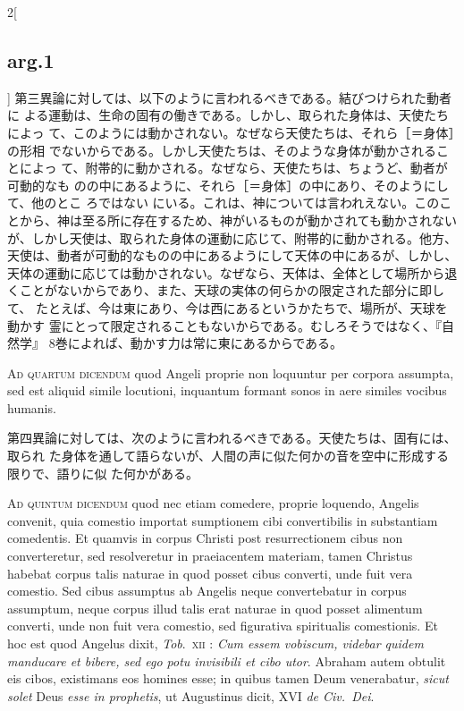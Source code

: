 \documentclass[paper=a4paper,fontsize=10pt,jafontsize=9pt,titlepage]{jlreq}
\begin{document}
\begin{paracol}{2}[\subsection{arg.1}]
第三異論に対しては、以下のように言われるべきである。結びつけられた動者に
よる運動は、生命の固有の働きである。しかし、取られた身体は、天使たちによっ
て、このようには動かされない。なぜなら天使たちは、それら［＝身体］の形相
でないからである。しかし天使たちは、そのような身体が動かされることによっ
て、附帯的に動かされる。なぜなら、天使たちは、ちょうど、動者が可動的なも
のの中にあるように、それら［＝身体］の中にあり、そのようにして、他のとこ
ろではない にいる。これは、神については言われえない。このこ
とから、神は至る所に存在するため、神がいるものが動かされても動かされない
が、しかし天使は、取られた身体の運動に応じて、附帯的に動かされる。他方、
天使は、動者が可動的なものの中にあるようにして天体の中にあるが、しかし、
天体の運動に応じては動かされない。なぜなら、天体は、全体として場所から退
くことがないからであり、また、天球の実体の何らかの限定された部分に即して、
たとえば、今は東にあり、今は西にあるというかたちで、場所が、天球を動かす
霊にとって限定されることもないからである。むしろそうではなく、『自然学』
 8巻によれば、動かす力は常に東にあるからである。

\switchcolumn*[\subsection{ad.4}]

{\scshape Ad quartum dicendum} quod Angeli proprie non loquuntur per corpora
assumpta, sed est aliquid simile locutioni, inquantum formant sonos in aere
similes vocibus humanis.

\switchcolumn

第四異論に対しては、次のように言われるべきである。天使たちは、固有には、取られ
た身体を通して語らないが、人間の声に似た何かの音を空中に形成する限りで、語りに似
た何かがある。

\switchcolumn*[\subsection{ad.5}]

{\scshape Ad quintum dicendum} quod nec etiam comedere, proprie loquendo,
Angelis convenit, quia comestio importat sumptionem cibi convertibilis in
substantiam comedentis. Et quamvis in corpus Christi post resurrectionem cibus
non converteretur, sed resolveretur in praeiacentem materiam, tamen Christus
habebat corpus talis naturae in quod posset cibus converti, unde fuit vera
comestio. Sed cibus assumptus ab Angelis neque convertebatur in corpus
assumptum, neque corpus illud talis erat naturae in quod posset alimentum
converti, unde non fuit vera comestio, sed figurativa spiritualis
comestionis. Et hoc est quod Angelus dixit, {\itshape Tob}.~{\scshape xii} :
{\itshape Cum essem vobiscum, videbar quidem manducare et bibere, sed ego potu
invisibili et cibo utor}. Abraham autem obtulit eis cibos, existimans eos
homines esse; in quibus tamen Deum venerabatur, {\itshape sicut solet} Deus
{\itshape esse in prophetis}, ut Augustinus dicit, XVI {\itshape de Civ.~Dei}.


\end{paracol}
\end{document}
